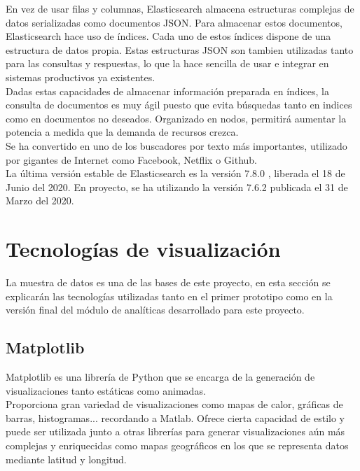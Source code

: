 \documentclass[a4paper, 12pt]{book}
\begin{document}
		En vez de usar filas y columnas, Elasticsearch almacena estructuras complejas de datos serializadas como documentos JSON. Para almacenar estos documentos, Elasticsearch hace uso de índices. Cada uno de estos índices dispone de una estructura de datos propia. Estas estructuras JSON son tambien utilizadas tanto para las consultas y respuestas, lo que la hace sencilla de usar e integrar en sistemas productivos ya existentes.\\
		
		Dadas estas capacidades de almacenar información preparada en índices, la consulta de documentos es muy ágil puesto que evita búsquedas tanto en indices como en documentos no deseados. Organizado en nodos, permitirá aumentar la potencia a medida que la demanda de recursos crezca. \\
		
		Se ha convertido en uno de los buscadores por texto más importantes, utilizado por gigantes de Internet como Facebook, Netflix o Github. \\
		
		La última versión estable de Elasticsearch es la versión 7.8.0 \cite{versions_elasticsearch}, liberada el 18 de Junio del 2020. En proyecto, se ha utilizando la versión 7.6.2 publicada el 31 de Marzo del 2020.
		
	
	\section{Tecnologías de visualización} 
	\label{sec:tecnologias_visualizacion} 
		La muestra de datos es una de las bases de este proyecto, en esta sección se explicarán las tecnologías utilizadas tanto en el primer prototipo como en la versión final del módulo de analíticas desarrollado para este proyecto.
		
	\subsection{Matplotlib}
	\label{subsec:matplotlib}
		Matplotlib es una librería de Python que se encarga de la generación de visualizaciones tanto estáticas como animadas. \\
		
		Proporciona gran variedad de visualizaciones como mapas de calor, gráficas de barras, histogramas... recordando a Matlab. Ofrece cierta capacidad de estilo y puede ser utilizada junto a otras librerías para generar visualizaciones aún más complejas y enriquecidas como mapas geográficos en los que se representa datos mediante latitud y longitud. \\
		
\end{document}
